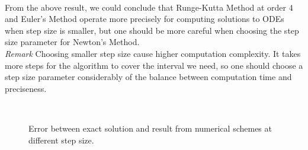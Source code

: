 \documentclass[
11pt, %
a4paper, %
oneside, %
headinclude,footinclude, %
BCOR5mm, %
]{scrartcl}
\begin{document}
\vspace{0.6em}\\From the above result, we could conclude that Runge-Kutta Method at order $4$ and Euler's Method operate more precisely for computing solutions to ODEs when step size is smaller, but one should be more careful when choosing the step size parameter for Newton's Method. 
\vspace{0.6em}\\ \textit{Remark} Choosing smaller step size cause higher computation complexity. It takes more steps for the algorithm to cover the interval we need, so one should choose a step size parameter considerably of the balance between computation time and preciseness.

\begin{figure}[tb]
\centering
{} 
 \\
 \quad
\caption[error]{Error between exact solution and result from numerical schemes at different step size.} 
\label{error}
\end{figure}
\newpage
\end{document}
